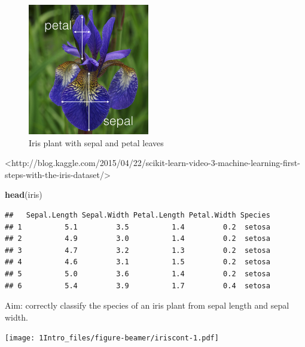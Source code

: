 \documentclass[ignorenonframetext,]{beamer}
\newenvironment{Shaded}{\begin{snugshade}}{\end{snugshade}}
\newcommand{\KeywordTok}[1]{\textcolor[rgb]{0.13,0.29,0.53}{\textbf{#1}}}
\newcommand{\NormalTok}[1]{#1}
\begin{document}
\begin{frame}

\begin{figure}
\includegraphics[width=150pt]{iris} \caption{Iris plant with sepal and petal leaves}\label{fig:iris_pic}
\end{figure}

\tiny
<http://blog.kaggle.com/2015/04/22/scikit-learn-video-3-machine-learning-first-steps-with-the-iris-dataset/>

\end{frame}

\begin{frame}[fragile]

\scriptsize

\begin{Shaded}
\begin{Highlighting}[]
\KeywordTok{head}\NormalTok{(iris)}
\end{Highlighting}
\end{Shaded}

\begin{verbatim}
##   Sepal.Length Sepal.Width Petal.Length Petal.Width Species
## 1          5.1         3.5          1.4         0.2  setosa
## 2          4.9         3.0          1.4         0.2  setosa
## 3          4.7         3.2          1.3         0.2  setosa
## 4          4.6         3.1          1.5         0.2  setosa
## 5          5.0         3.6          1.4         0.2  setosa
## 6          5.4         3.9          1.7         0.4  setosa
\end{verbatim}

\normalsize

\end{frame}

\begin{frame}

Aim: correctly classify the species of an iris plant from sepal length
and sepal width.

\texttt{[image: 1Intro\_files/figure-beamer/iriscont-1.pdf]}

\end{frame}
\end{document}
